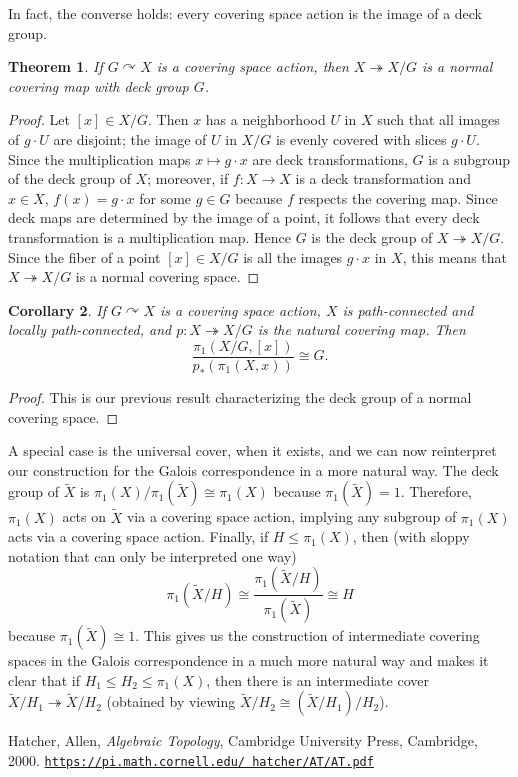 \documentclass{article}
\newtheorem{thm}{Theorem}[section]
\newtheorem{cor}[thm]{Corollary}
\theoremstyle{definition}
\theoremstyle{remark}
\numberwithin{figure}{section}
\begin{document}
In fact, the converse holds: every covering space action is the image of a deck group.

\begin{thm}
	If $G \curvearrowright X$ is a covering space action, then $X \twoheadrightarrow X/G$ is a normal covering map with deck group $G$.
\end{thm}

\begin{proof}
	Let $[x] \in X/G$. Then $x$ has a neighborhood $U$ in $X$ such that all images of $g \cdot U$ are disjoint; the image of $U$ in $X/G$ is evenly covered with slices $g \cdot U$. Since the multiplication maps $x \mapsto g \cdot x$ are deck transformations, $G$ is a subgroup of the deck group of $X$; moreover, if $f : X \to X$ is a deck transformation and $x \in X$, $f(x) = g \cdot x$ for some $g \in G$ because $f$ respects the covering map. Since deck maps are determined by the image of a point, it follows that every deck transformation is a multiplication map. Hence $G$ is the deck group of $X \twoheadrightarrow X/G$. Since the fiber of a point $[x] \in X/G$ is all the images $g \cdot x$ in $X$, this means that $X \twoheadrightarrow X/G$ is a normal covering space.
\end{proof}

\begin{cor}
	If $G \curvearrowright X$ is a covering space action, $X$ is path-connected and locally path-connected, and $p : X \twoheadrightarrow X/G$ is the natural covering map. Then
	\[
	\frac{\pi_1(X/G, [x])}{p_*(\pi_1(X, x))} \cong G.
	\]
\end{cor}

\begin{proof}
	This is our previous result characterizing the deck group of a normal covering space.
\end{proof}

A special case is the universal cover, when it exists, and we can now reinterpret our construction for the Galois correspondence in a more natural way. The deck group of $\tilde X$ is $\pi_1(X)/\pi_1(\tilde X) \cong \pi_1(X)$ because $\pi_1(\tilde X) = 1$. Therefore, $\pi_1(X)$ acts on $\tilde X$ via a covering space action, implying any subgroup of $\pi_1(X)$ acts via a covering space action. Finally, if $H \leq \pi_1(X)$, then (with sloppy notation that can only be interpreted one way)
\[
\pi_1(\tilde X/H) \cong \frac{\pi_1(\tilde X/H)}{\pi_1(\tilde X)} \cong H
\]
because $\pi_1(\tilde X) \cong 1$. This gives us the construction of intermediate covering spaces in the Galois correspondence in a much more natural way and makes it clear that if $H_1 \leq H_2 \leq \pi_1(X)$, then there is an intermediate cover $\tilde X/H_1 \twoheadrightarrow \tilde X/H_2$ (obtained by viewing $\tilde X/H_2 \cong (\tilde X/H_1)/H_2$).

\begin{thebibliography}{H}
	 Hatcher, Allen, \emph{Algebraic Topology}, Cambridge University Press, Cambridge, 2000. \href{https://pi.math.cornell.edu/~hatcher/AT/AT.pdf}{\texttt{https://pi.math.cornell.edu/~hatcher/AT/AT.pdf}}
\end{thebibliography}
\end{document}
